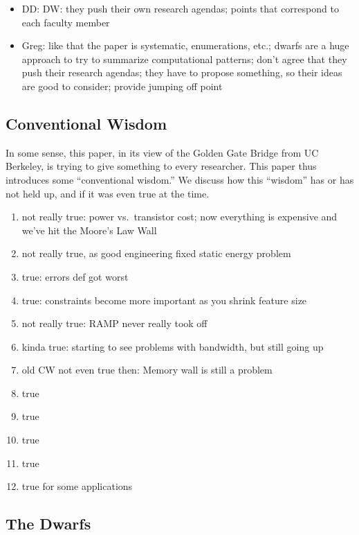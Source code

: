 \begin{itemize}
    \item DD: %
        DW: they push their own research agendas; points that correspond to each faculty member
    \item Greg: like that the paper is systematic, enumerations, etc.; dwarfs are a huge approach to try to summarize computational patterns; don't agree that they push their research agendas; they have to propose something, so their ideas are good to consider; provide jumping off point
\end{itemize}

\subsection{Conventional Wisdom}\label{feb-11:a-view:conventional}
In some sense, this paper, in its view of the Golden Gate Bridge from UC Berkeley, is trying to give something to every researcher.
This paper thus introduces some ``conventional wisdom.''
We discuss how this ``wisdom'' has or has not held up, and if it was even true at the time.

\begin{enumerate}
    \item not really true: power vs.\ transistor cost; now everything is expensive and we've hit the Moore's Law Wall
    \item not really true, as good engineering fixed static energy problem
    \item true: errors def got worst
    \item true: constraints become more important as you shrink feature size
    \item not really true: RAMP never really took off
    \item kinda true: starting to see problems with bandwidth, but still going up
    \item old CW not even true then: Memory wall is still a problem
    \item true
    \item true
    \item true
    \item true
    \item true for some applications
\end{enumerate}

\subsection{The Dwarfs}\label{feb-11:a-view:dwarfs}

